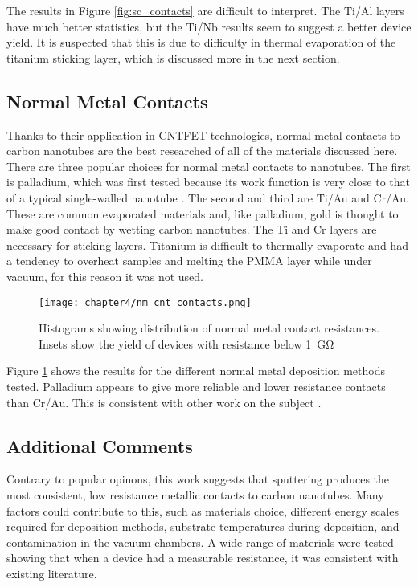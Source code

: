 The results in Figure \ref{fig:sc_contacts} are difficult to interpret. The Ti/Al layers have much better statistics, but the Ti/Nb results seem to suggest a better device yield. It is suspected that this is due to difficulty in thermal evaporation of the titanium sticking layer, which is discussed more in the next section.

\subsection{Normal Metal Contacts}
\label{sec:nm_contacts}

Thanks to their application in CNTFET technologies, normal metal contacts to carbon nanotubes are the best researched of all of the materials discussed here. There are three popular choices for normal metal contacts to nanotubes. The first is palladium, which was first tested because its work function is very close to that of a typical single-walled  nanotube \cite{Javey2003, Jejurikar2010}. The second and third are Ti/Au and Cr/Au. These are common evaporated materials and, like palladium, gold is thought to make good contact by wetting carbon nanotubes. The Ti and Cr layers are necessary for sticking layers. Titanium is difficult to thermally evaporate and had a tendency to overheat samples and melting the PMMA layer while under vacuum, for this reason it was not used. 

\begin{figure}
    \centering
    \texttt{[image: chapter4/nm\_cnt\_contacts.png]}
    \caption{Histograms showing distribution of normal metal contact resistances. Insets show the yield of devices with resistance below \SI{1}{\giga\ohm}}
    \label{fig:nm_contacts}
\end{figure}

Figure \ref{fig:nm_contacts} shows the results for the different normal metal deposition methods tested. Palladium appears to give more reliable and lower resistance contacts than Cr/Au. This is consistent with other work on the subject \cite{Javey2003}.

\subsection{Additional Comments}

Contrary to popular opinons, this work suggests that sputtering produces the most consistent, low resistance metallic contacts to carbon nanotubes. Many factors could contribute to this, such as materials choice, different energy scales required for deposition methods, substrate temperatures during deposition, and contamination in the vacuum chambers. A wide range of materials were tested showing that when a device had a measurable resistance, it was consistent with existing literature. 

